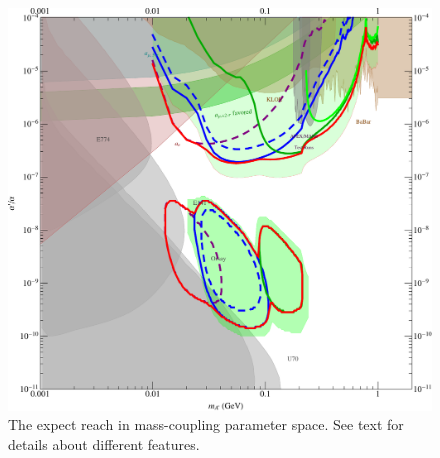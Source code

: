\begin{figure}
\includegraphics[scale=0.8]{reach/HPS-Proposal2014-DetailedReach.pdf}
\caption{The expect reach in mass-coupling parameter space.  See text for details about different features.}
\label{fig:reachDetailed}
\end{figure} 



